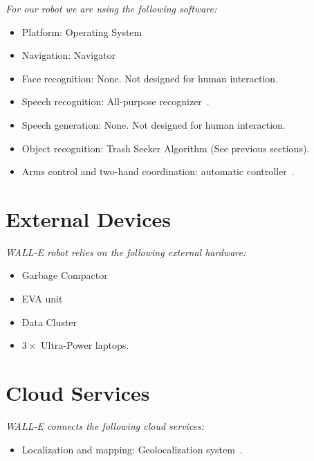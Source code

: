 \textit{For our robot we are using the following software:}

\begin{itemize}
	\item Platform: \BnL{} Operating System
	\item Navigation: \BnL{} Navigator
	\item Face recognition: None. Not designed for human interaction.
	\item Speech recognition: \BnL{} All-purpose recognizer~\cite{bnl1}.
	\item Speech generation: None. Not designed for human interaction.
	\item Object recognition: \BnL{} Trash Seeker Algorithm (See previous sections).
	\item Arms control and two-hand coordination: \BnL{} automatic controller~\cite{bnl2}.
\end{itemize}

\section*{External Devices}

\textit{WALL-E robot relies on the following external hardware:}

\begin{itemize}
	\item \BnL{} Garbage Compactor
	\item \BnL{} EVA unit
	\item \BnL{} Data Cluster
	\item $3 \times$ \BnL{} Ultra-Power laptops.
\end{itemize}

\section*{Cloud Services}

\textit{WALL-E connects the following cloud services:}
\begin{itemize}
	\item Localization and mapping: \BnL{} Geolocalization system~\cite{bnl3}.
\end{itemize}
